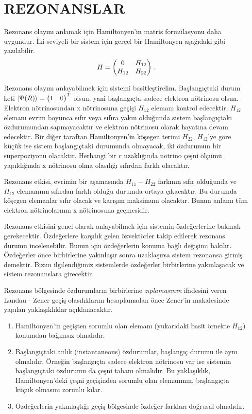 \newpage
\chapter{REZONANSLAR}\label{ch:Rezonanslar}
Rezonans olayını anlamak için Hamiltonyen'in matris formülasyonu daha uygundur. İki seviyeli bir sistem için gerçel bir Hamiltonyen aşağıdaki gibi yazılabilir.
\begin{equation}
	H = \mqty(0 & H_{12}\\ H_{12} & H_{22} ) \text{ .}
\end{equation}

Rezonans olayını anlayabilmek için sistemi basitleştirelim. Başlangıçtaki durum keti $ \ket{\Psi(R)} = \mqty(1 & 0)^{T} $ olsun, yani başlangıçta sadece elektron nötrinosu olsun. Elektron nötrinosundan x nötrinosuna geçişi $ H_{12} $ elemanı kontrol edecektir. $ H_{12} $ elemanı evrim boyunca sıfır veya sıfıra yakın olduğunda sistem başlangıçtaki özdurumundan sapmayacaktır ve elektron nötrinosu olarak hayatına devam edecektir. Bir diğer taraftan Hamiltonyen'in köşegen terimi $ H_{22} $, $ H_{12} $'ye göre küçük ise sistem başlangıçtaki durumunda olmayacak, iki özdurumun bir süperpoziyonu olacaktır. Herhangi bir $ r $ uzaklığında nötrino çeşni ölçümü yapıldığında x nötrinosu olma olasılığı sıfırdan farklı olacaktır.

Rezonans etkisi, evrimin bir aşamasında $ H_{11}-H_{22} $ farkının sıfır olduğunda ve $ H_{12} $ elemanının sıfırdan farklı olduğu durumda ortaya çıkacaktır. Bu durumda köşegen elemanlar sıfır olacak ve karışım maksimum olacaktır. Bunun anlamı tüm elektron nötrinolarının x nötrinosuna geçmesidir.

Rezonans etkisini genel olarak anlayabilmek için sistemin özdeğerlerine bakmak gerekecektir. Özdeğerlere karşılık gelen özvektörler takip edilerek rezonans durumu incelenebilir. Bunun için özdeğerlerin konuma bağlı değişimi bakılır. Özdeğerler önce birbirlerine yakınlaşır sonra uzaklaşırsa sistem rezonansa girmiş demektir. Bizim ilgilendiğimiz sistemlerde özdeğerler birbirlerine yakınlaşacak ve sistem rezonanslara girecektir.

Rezonans bölgesinde özdurumların birbirlerine \emph{zıplamasının} ifadesini veren Landau - Zener geçiş olasılıklarını hesaplamadan önce Zener'in makalesinde \cite{1932RSPSA.137..696Z} yapılan yaklaşıklıklar açıklanacaktır. 
\begin{enumerate}
	\item Hamiltonyen'in geçişten sorumlu olan elemanı (yukarıdaki basit örnekte $ H_{12} $) konumdan bağımsız olmalıdır.
 	\item Başlangıçtaki anlık (instantaneous) özdurumlar, başlangıç durumu ile aynı olmalıdır. Örneğin başlangıçta sadece elektron nötrinosu var ise sistemin başlangıçtaki özdurumu da çeşni tabanı olmalıdır. Bu yaklaşıklık, Hamiltonyen'deki çeşni geçişinden sorumlu olan elemanının, başlangıçta küçük olmasını zorunlu kılar.
  	\item Özdeğerlerin yakınlaştığı geçiş bölgesinde özdeğer farkları doğrusal olmalıdır.
\end{enumerate}

